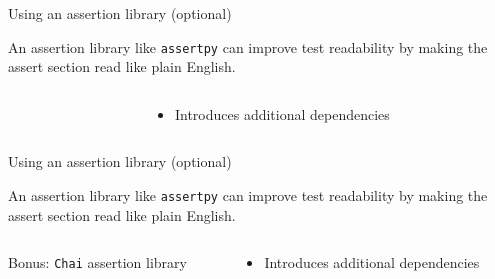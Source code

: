 \documentclass[english,handout,10pt,aspectratio=169,t]{beamer}
\begin{document}
\begin{frame}{Using an assertion library (optional)}
  \begin{minipage}{\textwidth}
    An assertion library like \texttt{assertpy} can improve test readability by
    making the assert section read like plain English.
  \end{minipage}
  \begin{columns}[T]
    \begin{column}{0.5\textwidth}
      \begin{minipage}{\textwidth}
        \assertionlibrary
      \end{minipage}
    \end{column}
    \begin{column}{0.5\textwidth}
      \begin{itemize}
        \item Introduces additional dependencies
      \end{itemize}
    \end{column}
  \end{columns}
\end{frame}

\begin{frame}{Using an assertion library (optional)}
  \begin{minipage}{\textwidth}
    An assertion library like \texttt{assertpy} can improve test readability by
    making the assert section read like plain English.
  \end{minipage}
  \begin{columns}[T]
    \begin{column}{0.5\textwidth}
      \begin{minipage}{\textwidth}
        \assertionlibrary

        Bonus: \texttt{Chai} assertion library
        \chailibrary
      \end{minipage}
    \end{column}
    \begin{column}{0.5\textwidth}
      \begin{itemize}
        \item Introduces additional dependencies
      \end{itemize}
    \end{column}
  \end{columns}
\end{frame}
\end{document}
